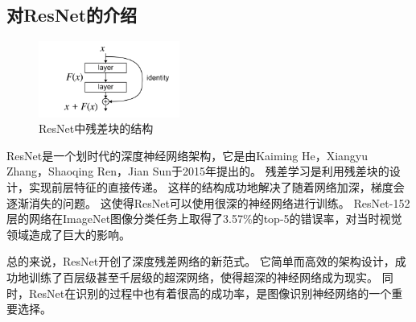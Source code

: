 \subsection{对ResNet的介绍}

\begin{figure}
    \centering %
    \includegraphics[height=2.5cm]{../../ResNet/ResBlock.png}
    \caption{ResNet中残差块的结构}
\end{figure}

ResNet是一个划时代的深度神经网络架构，它是由Kaiming He，Xiangyu Zhang，Shaoqing Ren，Jian Sun于2015年提出的。\cite{ResNet}
残差学习是利用残差块的设计，实现前层特征的直接传递。
这样的结构成功地解决了随着网络加深，梯度会逐渐消失的问题。
这使得ResNet可以使用很深的神经网络进行训练。
ResNet-152层的网络在ImageNet图像分类任务上取得了3.57\%的top-5的错误率，对当时视觉领域造成了巨大的影响。 \par

总的来说，ResNet开创了深度残差网络的新范式。
它简单而高效的架构设计，成功地训练了百层级甚至千层级的超深网络，使得超深的神经网络成为现实。
同时，ResNet在识别的过程中也有着很高的成功率，是图像识别神经网络的一个重要选择。

